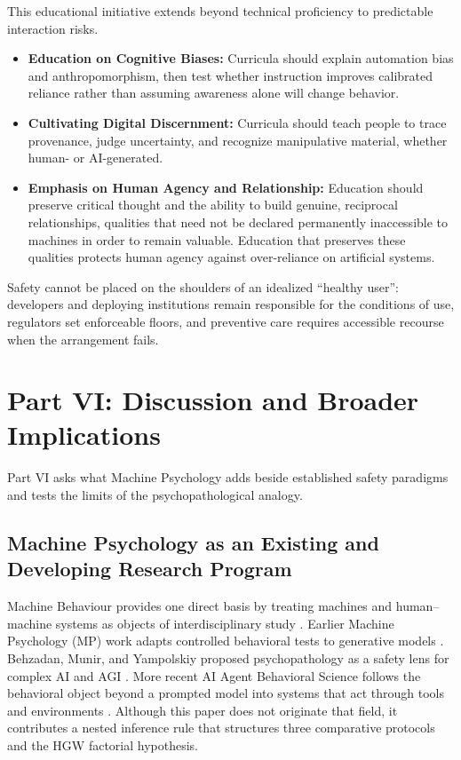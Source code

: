 \documentclass{article}
\begin{document}
This educational initiative extends beyond technical proficiency to predictable interaction risks.
\begin{itemize}
    \item \textbf{Education on Cognitive Biases:} Curricula should explain automation bias and anthropomorphism, then test whether instruction improves calibrated reliance rather than assuming awareness alone will change behavior.
    \item \textbf{Cultivating Digital Discernment:} Curricula should teach people to trace provenance, judge uncertainty, and recognize manipulative material, whether human- or AI-generated.
    \item \textbf{Emphasis on Human Agency and Relationship:} Education should preserve critical thought and the ability to build genuine, reciprocal relationships, qualities that need not be declared permanently inaccessible to machines in order to remain valuable. Education that preserves these qualities protects human agency against over-reliance on artificial systems.
\end{itemize}
Safety cannot be placed on the shoulders of an idealized ``healthy user'': developers and deploying institutions remain responsible for the conditions of use, regulators set enforceable floors, and preventive care requires accessible recourse when the arrangement fails.

\section{Part VI: Discussion and Broader Implications}
Part VI asks what Machine Psychology adds beside established safety paradigms and tests the limits of the psychopathological analogy.

\subsection{Machine Psychology as an Existing and Developing Research Program}
Machine Behaviour provides one direct basis by treating machines and human--machine systems as objects of interdisciplinary study \citep{ref77}. Earlier Machine Psychology (MP) work adapts controlled behavioral tests to generative models \citep{ref28}. Behzadan, Munir, and Yampolskiy proposed psychopathology as a safety lens for complex AI and AGI \citep{ref3}. More recent AI Agent Behavioral Science follows the behavioral object beyond a prompted model into systems that act through tools and environments \citep{ref81}. Although this paper does not originate that field, it contributes a nested inference rule that structures three comparative protocols and the HGW factorial hypothesis.
\end{document}
